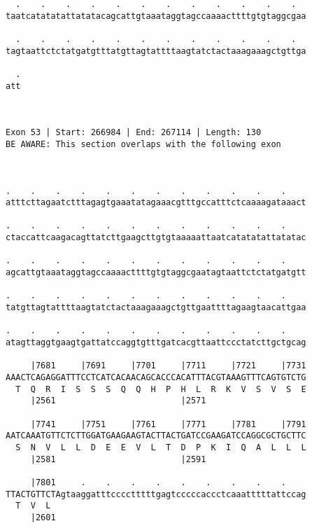 \documentclass{article}
\begin{document}
\begin{Verbatim}
  .    .    .    .    .    .    .    .    .    .    .    .  
taatcatatatattatatacagcattgtaaataggtagccaaaacttttgtgtaggcgaa
                                                            
  .    .    .    .    .    .    .    .    .    .    .    .  
tagtaattctctatgatgtttatgttagtattttaagtatctactaaagaaagctgttga
                                                            
  .
att
   
   
 
Exon 53 | Start: 266984 | End: 267114 | Length: 130
BE AWARE: This section overlaps with the following exon



.    .    .    .    .    .    .    .    .    .    .    .    
atttcttagaatctttagagtgaaatatagaaacgtttgccatttctcaaaagataaact
                                                            
.    .    .    .    .    .    .    .    .    .    .    .    
ctaccattcaagacagttatcttgaagcttgtgtaaaaattaatcatatatattatatac
                                                            
.    .    .    .    .    .    .    .    .    .    .    .    
agcattgtaaataggtagccaaaacttttgtgtaggcgaatagtaattctctatgatgtt
                                                            
.    .    .    .    .    .    .    .    .    .    .    .    
tatgttagtattttaagtatctactaaagaaagctgttgaattttagaagtaacattgaa
                                                            
.    .    .    .    .    .    .    .    .    .    .    .    
atagttaggtgaagtgattatccaggtgtttgatcacgttaattccctatcttgctgcag
                                                            
     |7681     |7691     |7701     |7711     |7721     |7731
AAACTCAGAGGATTTCCTCATCACAACAGCACCCACATTTACGTAAAGTTTCAGTGTCTG
  T  Q  R  I  S  S  S  Q  Q  H  P  H  L  R  K  V  S  V  S  E
     |2561                         |2571                    
  
     |7741     |7751     |7761     |7771     |7781     |7791
AATCAAATGTTCTCTTGGATGAAGAAGTACTTACTGATCCGAAGATCCAGGCGCTGCTTC
  S  N  V  L  L  D  E  E  V  L  T  D  P  K  I  Q  A  L  L  L
     |2581                         |2591                    
  
     |7801     .    .    .    .    .    .    .    .    .    
TTACTGTTCTAgtaaggatttcccctttttgagtcccccaccctcaaatttttattccag
  T  V  L                                                   
     |2601                                                  
  

\end{Verbatim}
\end{document}
